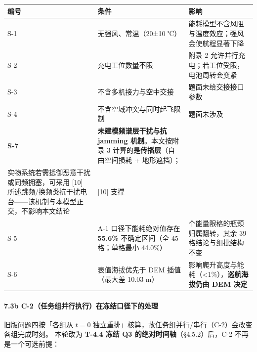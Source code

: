 \documentclass[
  10.5pt,
]{extarticle}
\newcounter{none} %
\begin{document}
{\def\LTcaptype{none} %
\begin{longtable}[]{@{}
  >{\raggedright\arraybackslash}p{}
  >{\raggedright\arraybackslash}p{}
  >{\raggedright\arraybackslash}p{}@{}}
\toprule\noalign{}
\begin{minipage}[b]{\linewidth}\raggedright
编号
\end{minipage} & \begin{minipage}[b]{\linewidth}\raggedright
条件
\end{minipage} & \begin{minipage}[b]{\linewidth}\raggedright
影响
\end{minipage} \\
\midrule\noalign{}
\endhead
\bottomrule\noalign{}
\endlastfoot
S-1 & 无强风、常温（20±10 ℃） &
能耗模型不含风阻与温度效应；强风会使航程显著下降 \\
S-2 & 充电工位数量不限 & 附录 2
允许并行充电；若工位受限，电池周转会变紧 \\
S-3 & 不含多机接力与空中交接 & 题面未给交接接口参数 \\
S-4 & 不含空域冲突与同时起飞限制 & 题面未涉及 \\
\textbf{S-7} & \textbf{未建模频谱层干扰与抗 jamming 机制}。本文按附录 3
计算的是\textbf{传播层}（自由空间损耗 + 地形遮挡）； & \\
实物系统若需抵御恶意干扰或同频拥塞，可采用 {[}10{]}
所述跳频/换频类抗干扰电台------该机制与本模型正交，不影响本文结论 &
{[}10{]} 支撑 & \\
S-5 & A-1 口径下能耗绝对值存在 \textbf{55.6\%} 不确定区间（全 45
格；单格最小 44.0\%） & 6 个能量限格的瓶颈归属翻转，其余 39
格结论与组批结构不变 \\
S-6 & 表值海拔优先于 DEM 插值（最大差 10.03 m） &
影响爬升高度与能耗（\textless1\%），\textbf{巡航海拔仍由 DEM 决定} \\
\end{longtable}
}

\paragraph{7.3b
C-2（任务组并行执行）在冻结口径下的处理}\label{b-c-2ux4efbux52a1ux7ec4ux5e76ux884cux6267ux884cux5728ux51bbux7ed3ux53e3ux5f84ux4e0bux7684ux5904ux7406}

旧版问题四按「各组从 \(t=0\)
独立重排」核算，故任务组并行/串行（C-2）会改变各组完成时刻。 本轮改为
\textbf{T-4.4 冻结 Q3 的绝对时间轴}（§4.5.2）后，C-2
不再是一个可选前提：
\end{document}

